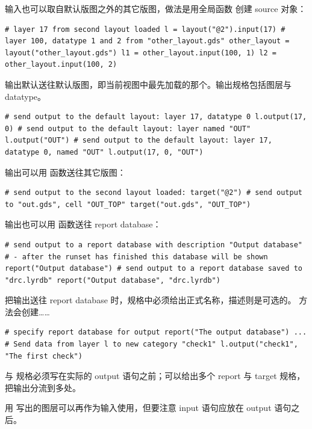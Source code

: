 输入也可以取自默认版图之外的其它版图，做法是用全局函数  创建 source 对象：

\begin{lstlisting}
# layer 17 from second layout loaded l = layout("@2").input(17) # layer 100, datatype 1 and 2 from "other_layout.gds" other_layout = layout("other_layout.gds") l1 = other_layout.input(100, 1) l2 = other_layout.input(100, 2)
\end{lstlisting}

输出默认送往默认版图，即当前视图中最先加载的那个。输出规格包括图层与 datatype。

\begin{lstlisting}
# send output to the default layout: layer 17, datatype 0 l.output(17, 0) # send output to the default layout: layer named "OUT" l.output("OUT") # send output to the default layout: layer 17, datatype 0, named "OUT" l.output(17, 0, "OUT")
\end{lstlisting}

输出可以用  函数送往其它版图：

\begin{lstlisting}
# send output to the second layout loaded: target("@2") # send output to "out.gds", cell "OUT_TOP" target("out.gds", "OUT_TOP")
\end{lstlisting}

输出也可以用  函数送往 report database：

\begin{lstlisting}
# send output to a report database with description "Output database" # - after the runset has finished this database will be shown report("Output database") # send output to a report database saved to "drc.lyrdb" report("Output database", "drc.lyrdb")
\end{lstlisting}

把输出送往 report database 时，规格中必须给出正式名称，描述则是可选的。 方法会创建……

\begin{lstlisting}
# specify report database for output report("The output database") ... # Send data from layer l to new category "check1" l.output("check1", "The first check")
\end{lstlisting}

 与  规格必须写在实际的 output 语句之前；可以给出多个 report 与 target 规格，把输出分流到多处。

用  写出的图层可以再作为输入使用，但要注意 input 语句应放在 output 语句之后。

